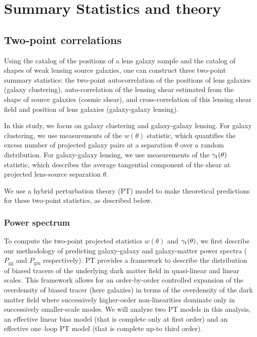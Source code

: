 \documentclass[aps, prd,twocolumn,superscriptaddress,nofootinbib,preprintnumbers]{revtex4-1}
\newcommand{\gammat}{\ensuremath{\gamma_{\rm t}(\theta)}}
\newcommand{\wtheta}{\ensuremath{w(\theta)}}
\newcommand{\pgg}{\ensuremath{P_{\mathrm{gg}}}}
\newcommand{\pgm}{\ensuremath{P_{\mathrm{gm}}}}
\newcommand{\jdr}[1]{{\color{blue}[JDR: #1]}}
\begin{document}
\section{Summary Statistics and theory}
\label{sec:stat_theory}
\subsection{Two-point correlations}
Using the catalog of the positions of a lens galaxy sample and the catalog of shapes of weak lensing source galaxies, one can construct three two-point summary statistics: the two-point autocorrelation of the positions of lens galaxies (galaxy clustering), auto-correlation of the lensing shear estimated from the shape of source galaxies (cosmic shear), and cross-correlation of this lensing shear field and position of lens galaxies (galaxy-galaxy lensing). 

In this study, we focus on galaxy clustering and galaxy-galaxy lensing. For galaxy clustering, we use measurements of the $w(\theta)$ statistic, which quantifies the excess number of projected galaxy pairs at a separation $\theta$ over a random distribution. For galaxy-galaxy lensing, we use measurements of the $\gamma_{\rm t}(\theta)$ statistic, which describes the average tangential component of the shear at projected lens-source separation $\theta$. 

We use a hybrid perturbation theory (PT) model to make theoretical predictions for these two-point statistics, as described below. 

\subsubsection{Power spectrum}
\label{sec:Pk_pred}

To compute the two-point projected statistics $\wtheta$ and $\gammat$, we first describe our methodology of predicting galaxy-galaxy and galaxy-matter power spectra ($\pgg$ and $\pgm$ respectively). PT provides a framework to describe the distribution of biased tracers of the underlying dark matter field in quasi-linear and linear scales. This framework allows for an order-by-order controlled expansion of the overdensity of biased tracer (here galaxies) in terms of the overdensity of the dark matter field where successively higher-order non-linearities dominate only in successively smaller-scale modes. We will analyze two PT models in this analysis, an effective linear bias model (that is complete only at first order) and an effective one--loop PT model (that is complete up-to third order). 
\end{document}
